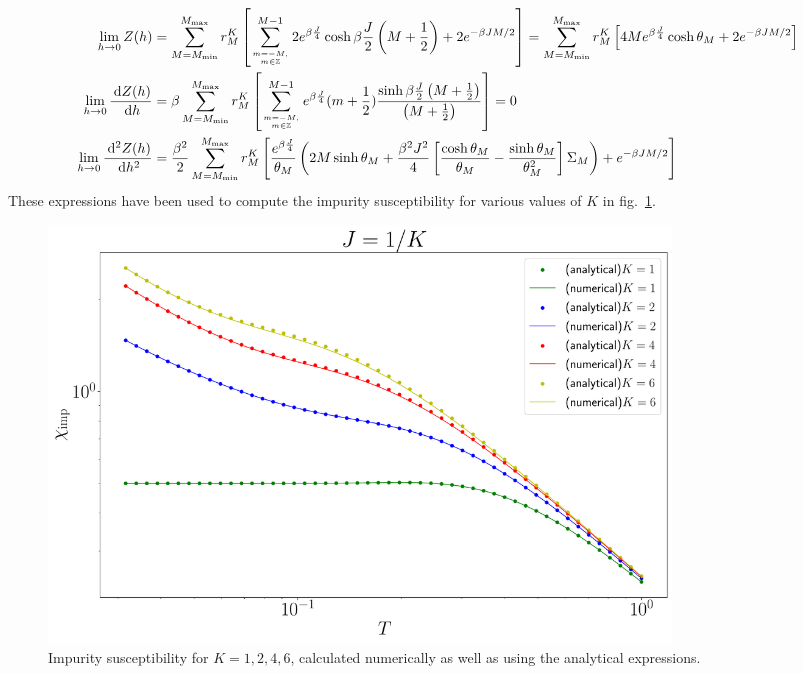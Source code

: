 \documentclass[12pt]{revtex4-2}
\begin{document}
\begin{align}
	\lim_{h \to 0}Z(h) &= \sum_{M=M_\text{min}}^{M_\text{max}}r^K_M\left[\sum_{m=-M, \atop{m\in \mathbb{Z}}}^{M-1}2e^{\beta \frac{J}{4}}\cosh \beta \frac{J}{2}\left( M + \frac{1}{2} \right) + 2e^{-\beta JM/2}\right] = \sum_{M=M_\text{min}}^{M_\text{max}}r^K_M\left[4Me^{\beta \frac{J}{4}}\cosh \theta_M + 2e^{-\beta JM/2}\right]\\
	\lim_{h \to 0}\frac{\:\mathrm{d}Z(h)}{\:\mathrm{d}h} &=  \beta\sum_{M=M_\text{min}}^{M_\text{max}}r^K_M\left[\sum_{m=-M, \atop{m\in \mathbb{Z}}}^{M-1}e^{\beta \frac{J}{4}}(m+\frac{1}{2})\frac{\sinh \beta\frac{J}{2}\left( M + \frac{1}{2} \right) }{\left( M + \frac{1}{2} \right)}\right] = 0\\
	\lim_{h \to 0}\frac{\:\mathrm{d}^2Z(h)}{\:\mathrm{d}h^2} &= \frac{\beta^2}{2}\sum_{M=M_\text{min}}^{M_\text{max}}r^K_M\left[\frac{e^{\beta \frac{J}{4}}}{\theta_M}\left(2M\sinh \theta_M + \frac{\beta^2 J^2}{4}\left[\frac{\cosh\theta_M}{\theta_M} - \frac{\sinh \theta_M}{\theta_M^2}\right]\Sigma_M\right)+ e^{-\beta JM/2}\right]\\
\end{align}
These expressions have been used to compute the impurity susceptibility for various values of \(K\) in fig.~\ref{chi_mchannel}.
\begin{figure}[htpb]
	\centering
	\includegraphics[width=0.8\textwidth]{../numerics/chi_mchannel.pdf}
	\caption{Impurity susceptibility for \(K=1,2,4,6\), calculated numerically as well as using the analytical expressions.}
	\label{chi_mchannel}
\end{figure}
\end{document}
